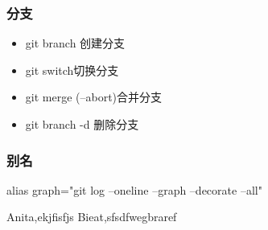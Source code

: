 \documentclass[a4paper,12pt]{article}
\begin{document}
\subsubsection{\color{green}分支}
\begin{itemize}
    \item git branch 创建分支
    \item git switch切换分支
    \item git merge (--abort)合并分支
    \item git branch -d 删除分支
\end{itemize}
\subsubsection{\color{green}别名}
alias graph="git log --oneline --graph --decorate --all"

\newpage

\begin{thebibliography}{99}
    Anita,ekjfisfjs
    Bieat,sfsdfwegbraref
\end{thebibliography}
\end{document}

